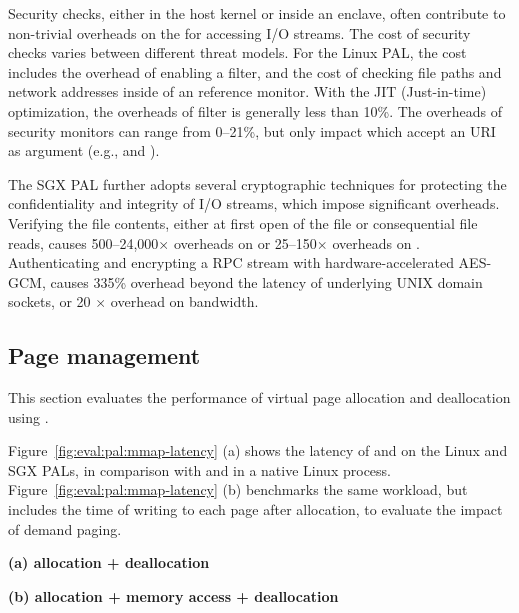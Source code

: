 Security checks, either in the host kernel or inside an enclave,
often contribute to
non-trivial overheads on the \hostapis{} for accessing I/O streams.
The cost of security checks
varies between different threat models.
For the Linux PAL, the cost includes the overhead of enabling a \seccomp{} filter, and the cost of checking file paths and network addresses
inside of an reference monitor.
With the JIT (Just-in-time) optimization,
the overheads of \seccomp{} filter is generally less than 10\%.
The overheads of security monitors can range from 0--21\%, but only impact \hostapis{} which accept an URI as argument (e.g.,  and ).

 
The SGX PAL further adopts several cryptographic techniques
for protecting the confidentiality and integrity of I/O streams, which impose significant overheads.
Verifying the file contents, either at first open of the file or consequential file reads,
causes 500--24,000$\times$ overheads on 
or 25--150$\times$ overheads on .
Authenticating and encrypting a RPC stream with hardware-accelerated AES-GCM,
causes \roughly{}335\% overhead beyond the latency of underlying UNIX domain sockets,
or \roughly{}20 $\times$ overhead on bandwidth.






\subsection{Page management}
\label{sec:eval:pal:memory}


This section evaluates the performance of virtual page allocation and deallocation
using \thehostabi{}.

Figure~\ref{fig:eval:pal:mmap-latency} (a)
shows the latency of  and   on the Linux and SGX PALs,
in comparison with  and  in a native Linux process.
Figure~\ref{fig:eval:pal:mmap-latency} (b)
benchmarks the same workload, but includes the time of writing to each page after allocation,
to evaluate the impact of demand paging.

\begin{figure*}[t!]
\centering
\footnotesize
{}
\parbox{0.49\textwidth}{\centering\bf (a) allocation + deallocation}
\parbox{0.49\textwidth}{\centering\bf (b) allocation + memory access + deallocation}
\caption{Latency of (a) allocating and deallocating a range of virtual pages, and (b) the same operations with writing to each page after allocation. Lower is better.
The comparison is between (1)  and  on Linux; (2)  and  on the Linux PAL, with and without a \seccomp{} filter ({\bf +SC}) and reference monitor ({\bf +RM}); (3) the same \hostapis{} on the SGX PAL, with and without zeroing the pages before use ({\bf +Zero}).}
\label{fig:eval:pal:mmap-latency}
\end{figure*}


